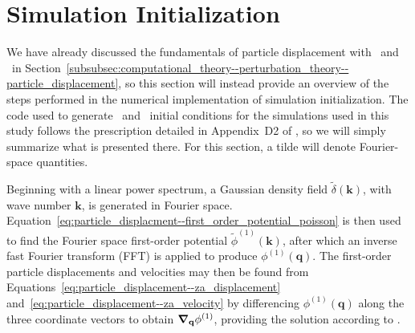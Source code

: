 
%
%

\section{Simulation Initialization}
\label{sec:initialization}



We have already discussed the fundamentals of particle displacement with \za\ and \lpt\ in Section~\ref{subsubsec:computational_theory--perturbation_theory--particle_displacement}, so this section will instead provide an overview of the steps performed in the numerical implementation of simulation initialization.  The code used to generate \za\ and \lpt\ initial conditions for the simulations used in this study follows the prescription detailed in Appendix~D2 of \citet{1998MNRAS.299.1097S}, so we will simply summarize what is presented there.  For this section, a tilde will denote Fourier-space quantities.

Beginning with a linear power spectrum, a Gaussian density field $\tilde{\delta}(\mathbf{k})$, with wave number $\mathbf{k}$, is generated in Fourier space.  Equation~\ref{eq:particle_displacment--first_order_potential_poisson} is then used to find the Fourier space first-order potential $\tilde{\phi}^{(1)}(\mathbf{k})$, after which an inverse fast Fourier transform (FFT) is applied to produce $\phi^{(1)}(\mathbf{q})$.  The first-order particle displacements and velocities may then be found from Equations~\ref{eq:particle_displacement--za_displacement} and~\ref{eq:particle_displacement--za_velocity} by differencing $\phi^{(1)}(\mathbf{q})$ along the three coordinate vectors to obtain ${\boldsymbol{\nabla}}_{\mathbf{q}} \phi^{(1)}$, providing the solution according to \za.

